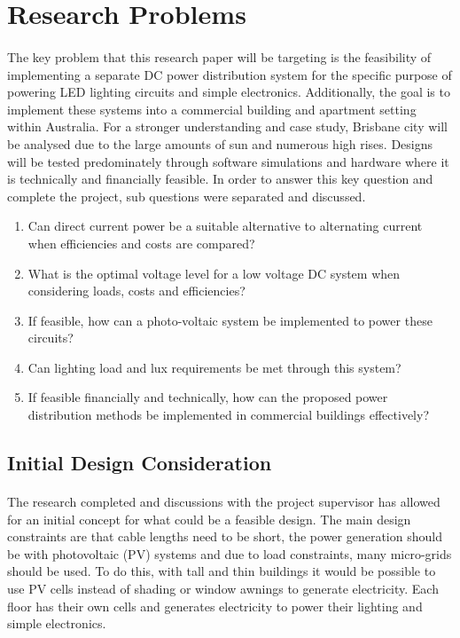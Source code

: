 
\section{Research Problems}

\paragraph{}
The key problem that this research paper will be targeting is the feasibility of implementing a separate DC power distribution system for the specific purpose of powering LED lighting circuits and simple electronics. Additionally, the goal is to implement these systems into a commercial building and apartment setting within Australia. For a stronger understanding and case study, Brisbane city will be analysed due to the large amounts of sun and numerous high rises. Designs will be tested predominately through software simulations and hardware where it is technically and financially feasible. In order to answer this key question and complete the project, sub questions were separated and discussed.

\begin{enumerate}
\itemsep-0.5em 
\item Can direct current power be a suitable alternative to alternating current when efficiencies and costs are compared?
\item What is the optimal voltage level for a low voltage DC system when considering loads, costs and efficiencies?
\item If feasible, how can a photo-voltaic system be implemented to power these circuits?
\item Can lighting load and lux requirements be met through this system?
\item If feasible financially and technically, how can the proposed power distribution methods be implemented in commercial buildings effectively?
\end{enumerate} 

\subsection{Initial Design Consideration}

\paragraph{}
The research completed and discussions with the project supervisor has allowed for an initial concept for what could be a feasible design. The main design constraints are that cable lengths need to be short, the power generation should be with photovoltaic (PV) systems and due to load constraints, many micro-grids should be used. To do this, with tall and thin buildings it would be possible to use PV cells instead of shading or window awnings to generate electricity. Each floor has their own cells and generates electricity to power their lighting and simple electronics. 

